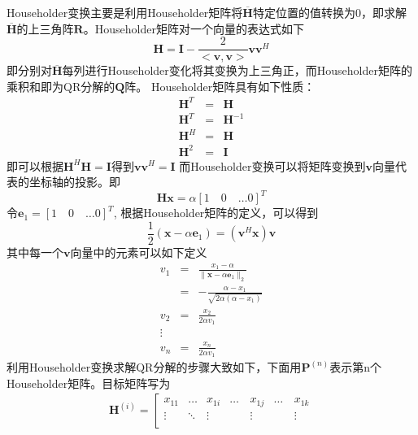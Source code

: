 \documentclass[bachelor,nocolorlinks, printoneside]{seuthesis} %
\begin{document}
\begin{Main}
Householder变换主要是利用Householder矩阵将$\overline{\mathbf{H}}$特定位置的值转换为0，即求解$\overline{\mathbf{H}}$的上三角阵$\mathbf{R}$。Householder矩阵对一个向量的表达式如下
\begin{equation}\label{key}
\mathbf{H} = \mathbf{I} - \frac{2}{<\mathbf{v},\mathbf{v}>} \mathbf{v}\mathbf{v}^H
\end{equation}
即分别对$\overline{\mathbf{H}}$每列进行Householder变化将其变换为上三角正，而Householder矩阵的乘积和即为QR分解的$\mathbf{Q}$阵。
Householder矩阵具有如下性质：
\begin{eqnarray}\label{key}
\mathbf{H}^T &=& \mathbf{H}  \nonumber \\
\mathbf{H}^T &=& \mathbf{H}^{-1}  \nonumber\\
\mathbf{H}^H &=& \mathbf{H}  \nonumber\\
\mathbf{H}^2 &=& \mathbf{I} \nonumber
\end{eqnarray}
即可以根据$\mathbf{H}^H\mathbf{H}=\mathbf{I}$得到$\mathbf{v}\mathbf{v}^H =\mathbf{I}$
而Householder变换可以将矩阵变换到$\mathbf{v}$向量代表的坐标轴的投影。即
\begin{equation}\label{key}
\mathbf{H}\mathbf{x} =\alpha [1 \quad 0 \quad \ldots 0]^T
\end{equation}
令$\mathbf{e}_1=[1 \quad 0 \quad \ldots 0]^T$,
根据Householder矩阵的定义，可以得到
\begin{equation}\label{key}
\frac{1}{2}(\mathbf{x}-\alpha \mathbf{e}_1)=(\mathbf{v}^H\mathbf{x})\mathbf{v}
\end{equation}
其中每一个$\mathbf{v}$向量中的元素可以如下定义
\begin{eqnarray}\label{key}
v_1 & = & \frac{x_1-\alpha}{\| \mathbf{x} - \alpha \mathbf{e}_1 \|_2} \nonumber \\
& = & -\frac{\alpha-x_1}{\sqrt{2\alpha(\alpha-x_1)}} \nonumber \\
v_2 & = & \frac{x_2}{2\alpha v_1} \nonumber  \\
\vdots \nonumber \\
v_n & = & \frac{x_n}{2\alpha v_1}
\end{eqnarray}
利用Householder变换求解QR分解的步骤大致如下，下面用$\mathbf{P}^{(n)}$表示第n个Householder矩阵。目标矩阵写为
\begin{eqnarray}\label{key}
\mathbf{H}^{(i)} =
\left[
\begin{array}{ccccccc}
x_{11} & \ldots & x_{1i} & \ldots & x_{1j} & \ldots & x_{1k} \\
\vdots & \ddots & \vdots & \quad & \vdots & \quad & \vdots \\

\end{array}
\end{eqnarray}
\end{Main}
\end{document}

